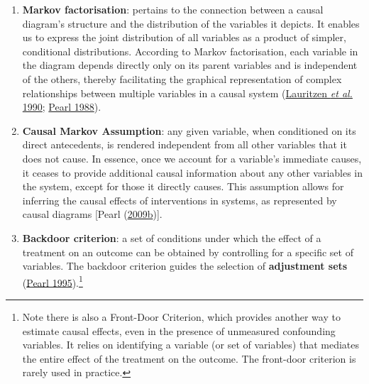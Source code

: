 \documentclass[
  singlecolumn]{article}
\begin{document}
\begin{enumerate}
\def\labelenumi{\arabic{enumi}.}
\setcounter{enumi}{9}
\item
  \textbf{Markov factorisation}: pertains to the connection between a
  causal diagram's structure and the distribution of the variables it
  depicts. It enables us to express the joint distribution of all
  variables as a product of simpler, conditional distributions.
  According to Markov factorisation, each variable in the diagram
  depends directly only on its parent variables and is independent of
  the others, thereby facilitating the graphical representation of
  complex relationships between multiple variables in a causal system
  (\protect\hyperlink{ref-lauritzen1990}{Lauritzen \emph{et al.} 1990};
  \protect\hyperlink{ref-pearl1988}{Pearl 1988}).
\item
  \textbf{Causal Markov Assumption}: any given variable, when
  conditioned on its direct antecedents, is rendered independent from
  all other variables that it does not cause. In essence, once we
  account for a variable's immediate causes, it ceases to provide
  additional causal information about any other variables in the system,
  except for those it directly causes. This assumption allows for
  inferring the causal effects of interventions in systems, as
  represented by causal diagrams {[}Pearl
  (\protect\hyperlink{ref-pearl2009a}{2009b}){]}.
\item
  \textbf{Backdoor criterion}: a set of conditions under which the
  effect of a treatment on an outcome can be obtained by controlling for
  a specific set of variables. The backdoor criterion guides the
  selection of \textbf{adjustment sets}
  (\protect\hyperlink{ref-pearl1995}{Pearl 1995}).\footnote{Note there
    is also a Front-Door Criterion, which provides another way to
    estimate causal effects, even in the presence of unmeasured
    confounding variables. It relies on identifying a variable (or set
    of variables) that mediates the entire effect of the treatment on
    the outcome. The front-door criterion is rarely used in practice.}
\end{enumerate}
\end{document}
